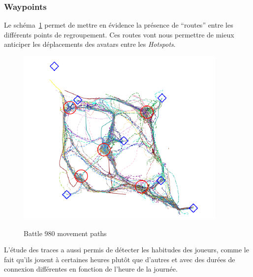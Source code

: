 		\subsubsection{Waypoints}
	Le schéma~\ref{sch_trace} permet de mettre en évidence la présence de ``routes'' entre les différents points de regroupement. Ces routes vont nous permettre de mieux anticiper les déplacements des avatars entre les \textit{Hotspots}.
        \vspace{1mm}
        \begin{figure}[!h]
        \centering
        \includegraphics[scale=0.75]{./Ressources/Images/trace.png}\\
        \caption{Battle 980 movement paths}
        \label{sch_trace}
        \end{figure}	
        \vspace{1mm}
\newline
	L'étude des traces a aussi permis de détecter les habitudes des joueurs, comme le fait qu'ils jouent à certaines heures plutôt que d'autres et avec des durées de connexion différentes en fonction de l'heure de la journée.
